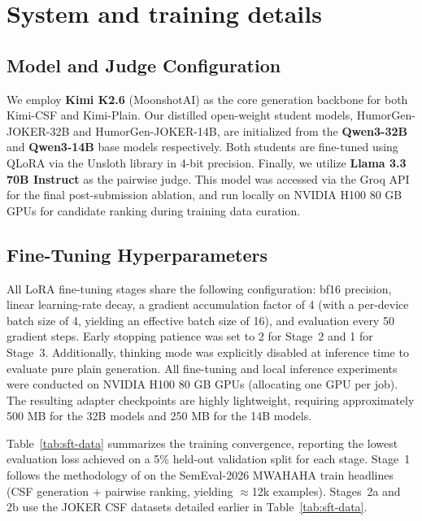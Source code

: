 \documentclass[]{ceurart}
\begin{document}


\appendix
\section{System and training details}
\label{sec:app-details}

\subsection{Model and Judge Configuration}
\label{sec:app-models}

We employ \textbf{Kimi K2.6} (MoonshotAI) as the core generation backbone for both Kimi-CSF and Kimi-Plain.
Our distilled open-weight student models, HumorGen-JOKER-32B and HumorGen-JOKER-14B, are initialized from the \textbf{Qwen3-32B} and \textbf{Qwen3-14B} base models respectively. Both students are fine-tuned using QLoRA via the Unsloth library in 4-bit precision.
Finally, we utilize \textbf{Llama 3.3 70B Instruct} as the pairwise judge. This model was accessed via the Groq API for the final post-submission ablation, and run locally on NVIDIA H100 80 GB GPUs for candidate ranking during training data curation.

\subsection{Fine-Tuning Hyperparameters}
\label{sec:app-hyperparams}

All LoRA fine-tuning stages share the following configuration: bf16 precision, linear learning-rate decay, a gradient accumulation factor of 4 (with a per-device batch size of 4, yielding an effective batch size of 16), and evaluation every 50 gradient steps. Early stopping patience was set to 2 for Stage~2 and 1 for Stage~3. Additionally, thinking mode was explicitly disabled at inference time to evaluate pure plain generation.
All fine-tuning and local inference experiments were conducted on NVIDIA H100 80 GB GPUs (allocating one GPU per job).
The resulting adapter checkpoints are highly lightweight, requiring approximately 500 MB for the 32B models and 250 MB for the 14B models.

Table~\ref{tab:sft-data} summarizes the training convergence, reporting the lowest evaluation loss achieved on a 5\% held-out validation split for each stage.
Stage~1 follows the methodology of \cite{ajayi2026humorgen} on the SemEval-2026 MWAHAHA train headlines (CSF generation + pairwise ranking, yielding ${\approx}$12k examples). Stages~2a and 2b use the JOKER CSF datasets detailed earlier in Table~\ref{tab:sft-data}.
\end{document}
